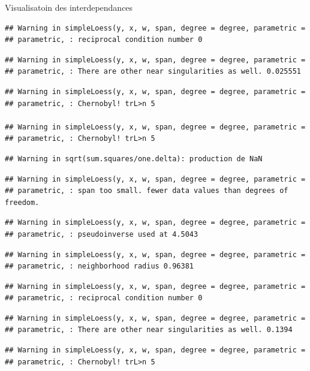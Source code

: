 \documentclass[11pt,ignorenonframetext,]{beamer}
\begin{document}
\begin{frame}[fragile]{Visualisatoin des interdependances}
\begin{verbatim}
## Warning in simpleLoess(y, x, w, span, degree = degree, parametric =
## parametric, : reciprocal condition number 0
\end{verbatim}

\begin{verbatim}
## Warning in simpleLoess(y, x, w, span, degree = degree, parametric =
## parametric, : There are other near singularities as well. 0.025551
\end{verbatim}

\begin{verbatim}
## Warning in simpleLoess(y, x, w, span, degree = degree, parametric =
## parametric, : Chernobyl! trL>n 5

## Warning in simpleLoess(y, x, w, span, degree = degree, parametric =
## parametric, : Chernobyl! trL>n 5
\end{verbatim}

\begin{verbatim}
## Warning in sqrt(sum.squares/one.delta): production de NaN
\end{verbatim}

\begin{verbatim}
## Warning in simpleLoess(y, x, w, span, degree = degree, parametric =
## parametric, : span too small. fewer data values than degrees of freedom.
\end{verbatim}

\begin{verbatim}
## Warning in simpleLoess(y, x, w, span, degree = degree, parametric =
## parametric, : pseudoinverse used at 4.5043
\end{verbatim}

\begin{verbatim}
## Warning in simpleLoess(y, x, w, span, degree = degree, parametric =
## parametric, : neighborhood radius 0.96381
\end{verbatim}

\begin{verbatim}
## Warning in simpleLoess(y, x, w, span, degree = degree, parametric =
## parametric, : reciprocal condition number 0
\end{verbatim}

\begin{verbatim}
## Warning in simpleLoess(y, x, w, span, degree = degree, parametric =
## parametric, : There are other near singularities as well. 0.1394
\end{verbatim}

\begin{verbatim}
## Warning in simpleLoess(y, x, w, span, degree = degree, parametric =
## parametric, : Chernobyl! trL>n 5


\end{verbatim}
\end{frame}
\end{document}
